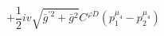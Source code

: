 %
\begin{dmath*}
%
  +  \frac{1}{2} i v \sqrt{{\bar g}^{\prime 2} + {\bar g}{}^2}C^{ \varphi  D} \left(p_1^{\mu_4} - p_2^{\mu_4}\right)
%
\end{dmath*}
%
